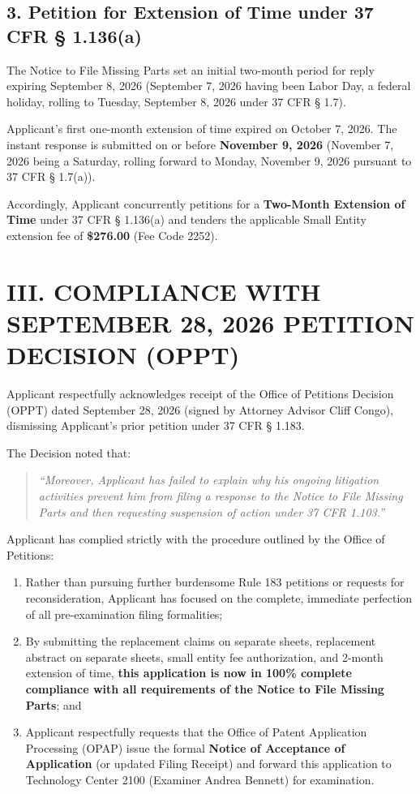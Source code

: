 \documentclass[11pt,letterpaper]{article}
\begin{document}
\subsection*{3. Petition for Extension of Time under 37 CFR \S{} 1.136(a)}

The Notice to File Missing Parts set an initial two-month period for reply expiring September 8, 2026 (September 7, 2026 having been Labor Day, a federal holiday, rolling to Tuesday, September 8, 2026 under 37 CFR \S{} 1.7). 

Applicant's first one-month extension of time expired on October 7, 2026. The instant response is submitted on or before \textbf{November 9, 2026} (November 7, 2026 being a Saturday, rolling forward to Monday, November 9, 2026 pursuant to 37 CFR \S{} 1.7(a)). 

Accordingly, Applicant concurrently petitions for a \textbf{Two-Month Extension of Time} under 37 CFR \S{} 1.136(a) and tenders the applicable Small Entity extension fee of \textbf{\$276.00} (Fee Code 2252).

\newpage

\section*{III. COMPLIANCE WITH SEPTEMBER 28, 2026 PETITION DECISION (OPPT)}

Applicant respectfully acknowledges receipt of the Office of Petitions Decision (OPPT) dated September 28, 2026 (signed by Attorney Advisor Cliff Congo), dismissing Applicant's prior petition under 37 CFR \S{} 1.183. 

The Decision noted that:
\begin{quote}
\textit{``Moreover, Applicant has failed to explain why his ongoing litigation activities prevent him from filing a response to the Notice to File Missing Parts and then requesting suspension of action under 37 CFR 1.103.''}
\end{quote}

Applicant has complied strictly with the procedure outlined by the Office of Petitions:
\begin{enumerate}[leftmargin=2em, itemsep=2pt, parsep=0pt]
    \item Rather than pursuing further burdensome Rule 183 petitions or requests for reconsideration, Applicant has focused on the complete, immediate perfection of all pre-examination filing formalities;
    \item By submitting the replacement claims on separate sheets, replacement abstract on separate sheets, small entity fee authorization, and 2-month extension of time, \textbf{this application is now in 100\% complete compliance with all requirements of the Notice to File Missing Parts}; and
    \item Applicant respectfully requests that the Office of Patent Application Processing (OPAP) issue the formal \textbf{Notice of Acceptance of Application} (or updated Filing Receipt) and forward this application to Technology Center 2100 (Examiner Andrea Bennett) for examination.
\end{enumerate}
\end{document}
